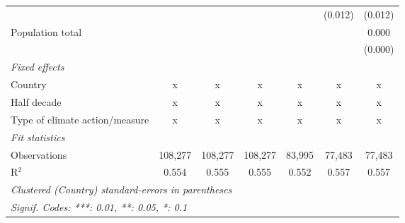 \begin{tabular}{lcccccc}
                                                                                   &               &                &                &                & (0.012)        & (0.012)\\   
   Population total                                                                &               &                &                &                &                & 0.000\\   
                                                                                   &               &                &                &                &                & (0.000)\\   
   \emph{Fixed effects}\\
   Country                                                                         & x             & x              & x              & x              & x              & x\\  
   Half decade                                                                     & x             & x              & x              & x              & x              & x\\  
   Type of climate action/measure                                                  & x             & x              & x              & x              & x              & x\\  
   \midrule \emph{Fit statistics}\\
   Observations                                                                    & 108,277       & 108,277        & 108,277        & 83,995         & 77,483         & 77,483\\  
   R$^2$                                                                           & 0.554         & 0.555          & 0.555          & 0.552          & 0.557          & 0.557\\  
   \midrule
   \multicolumn{7}{l}{\emph{Clustered (Country) standard-errors in parentheses}}\\
   \multicolumn{7}{l}{\emph{Signif. Codes: ***: 0.01, **: 0.05, *: 0.1}}\\
\end{tabular}
\par\endgroup


